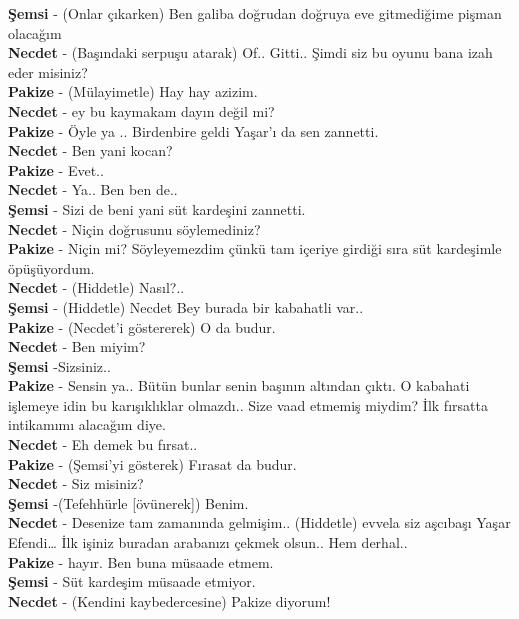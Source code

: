 \documentclass[]{book}
\begin{document}
\textbf{Şemsi} - (Onlar çıkarken) Ben galiba doğrudan doğruya eve gitmediğime pişman olacağım\\
\textbf{Necdet} - (Başındaki serpuşu atarak) Of.. Gitti.. Şimdi siz bu oyunu bana izah eder misiniz?\\
\textbf{Pakize} - (Mülayimetle) Hay hay azizim.\\
\textbf{Necdet} - ey bu kaymakam dayın değil mi?\\
\textbf{Pakize} - Öyle ya .. Birdenbire geldi Yaşar'ı da sen zannetti.\\
\textbf{Necdet} - Ben yani kocan?\\
\textbf{Pakize} - Evet..\\
\textbf{Necdet} - Ya.. Ben ben de..\\
\textbf{Şemsi} - Sizi de beni yani süt kardeşini zannetti.\\
\textbf{Necdet} - Niçin doğrusunu söylemediniz?\\
\textbf{Pakize} - Niçin mi? Söyleyemezdim çünkü tam içeriye girdiği sıra süt kardeşimle öpüşüyordum.\\
\textbf{Necdet} - (Hiddetle) Nasıl?..\\
\textbf{Şemsi} - (Hiddetle) Necdet Bey burada bir kabahatli var..\\
\textbf{Pakize} - (Necdet'i göstererek) O da budur.\\
\textbf{Necdet} - Ben miyim?\\
\textbf{Şemsi} -Sizsiniz..\\
\textbf{Pakize} - Sensin ya.. Bütün bunlar senin başının altından çıktı. O kabahati işlemeye idin bu karışıklıklar olmazdı.. Size vaad etmemiş miydim? İlk fırsatta intikamımı alacağım diye.\\
\textbf{Necdet} - Eh demek bu fırsat..\\
\textbf{Pakize} - (Şemsi'yi gösterek) Fırasat da budur.\\
\textbf{Necdet} - Siz misiniz?\\
\textbf{Şemsi} -(Tefehhürle {[}övünerek{]}) Benim.\\
\textbf{Necdet} - Desenize tam zamanında gelmişim.. (Hiddetle) evvela siz aşcıbaşı Yaşar Efendi\ldots{} İlk işiniz buradan arabanızı çekmek olsun.. Hem derhal..\\
\textbf{Pakize} - hayır. Ben buna müsaade etmem.\\
\textbf{Şemsi} - Süt kardeşim müsaade etmiyor.\\
\textbf{Necdet} - (Kendini kaybedercesine) Pakize diyorum!\\
\end{document}
